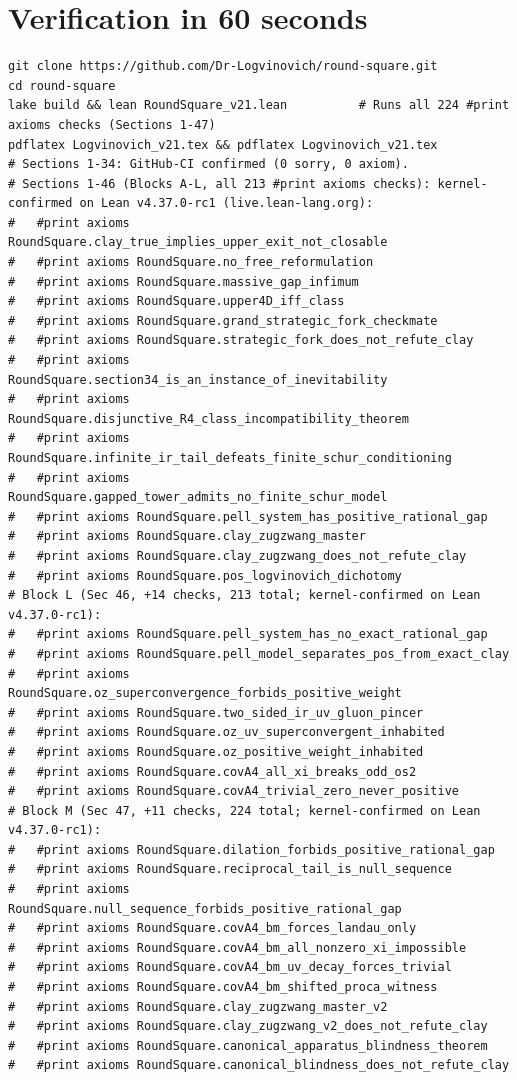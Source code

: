 \documentclass[11pt,a4paper]{article}
\theoremstyle{plain}
\theoremstyle{definition}
\theoremstyle{remark}
\renewcommand{\_}{\oldunderscore\allowbreak}
\begin{document}
\section{Verification in 60 seconds}
\begin{Verbatim}[fontsize=\scriptsize,frame=single,rulecolor=\color{darkgray}]
git clone https://github.com/Dr-Logvinovich/round-square.git
cd round-square
lake build && lean RoundSquare_v21.lean          # Runs all 224 #print axioms checks (Sections 1-47)
pdflatex Logvinovich_v21.tex && pdflatex Logvinovich_v21.tex
# Sections 1-34: GitHub-CI confirmed (0 sorry, 0 axiom).
# Sections 1-46 (Blocks A-L, all 213 #print axioms checks): kernel-confirmed on Lean v4.37.0-rc1 (live.lean-lang.org):
#   #print axioms RoundSquare.clay_true_implies_upper_exit_not_closable
#   #print axioms RoundSquare.no_free_reformulation
#   #print axioms RoundSquare.massive_gap_infimum
#   #print axioms RoundSquare.upper4D_iff_class
#   #print axioms RoundSquare.grand_strategic_fork_checkmate
#   #print axioms RoundSquare.strategic_fork_does_not_refute_clay
#   #print axioms RoundSquare.section34_is_an_instance_of_inevitability
#   #print axioms RoundSquare.disjunctive_R4_class_incompatibility_theorem
#   #print axioms RoundSquare.infinite_ir_tail_defeats_finite_schur_conditioning
#   #print axioms RoundSquare.gapped_tower_admits_no_finite_schur_model
#   #print axioms RoundSquare.pell_system_has_positive_rational_gap
#   #print axioms RoundSquare.clay_zugzwang_master
#   #print axioms RoundSquare.clay_zugzwang_does_not_refute_clay
#   #print axioms RoundSquare.pos_logvinovich_dichotomy
# Block L (Sec 46, +14 checks, 213 total; kernel-confirmed on Lean v4.37.0-rc1):
#   #print axioms RoundSquare.pell_system_has_no_exact_rational_gap
#   #print axioms RoundSquare.pell_model_separates_pos_from_exact_clay
#   #print axioms RoundSquare.oz_superconvergence_forbids_positive_weight
#   #print axioms RoundSquare.two_sided_ir_uv_gluon_pincer
#   #print axioms RoundSquare.oz_uv_superconvergent_inhabited
#   #print axioms RoundSquare.oz_positive_weight_inhabited
#   #print axioms RoundSquare.covA4_all_xi_breaks_odd_os2
#   #print axioms RoundSquare.covA4_trivial_zero_never_positive
# Block M (Sec 47, +11 checks, 224 total; kernel-confirmed on Lean v4.37.0-rc1):
#   #print axioms RoundSquare.dilation_forbids_positive_rational_gap
#   #print axioms RoundSquare.reciprocal_tail_is_null_sequence
#   #print axioms RoundSquare.null_sequence_forbids_positive_rational_gap
#   #print axioms RoundSquare.covA4_bm_forces_landau_only
#   #print axioms RoundSquare.covA4_bm_all_nonzero_xi_impossible
#   #print axioms RoundSquare.covA4_bm_uv_decay_forces_trivial
#   #print axioms RoundSquare.covA4_bm_shifted_proca_witness
#   #print axioms RoundSquare.clay_zugzwang_master_v2
#   #print axioms RoundSquare.clay_zugzwang_v2_does_not_refute_clay
#   #print axioms RoundSquare.canonical_apparatus_blindness_theorem
#   #print axioms RoundSquare.canonical_blindness_does_not_refute_clay
\end{Verbatim}
\end{document}
